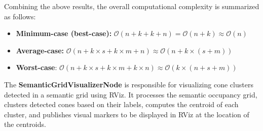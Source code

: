 \begin{itemize}
\end{itemize}

Combining the above results, the overall computational complexity is summarized as follows:

\begin{itemize}
    \item \textbf{Minimum-case (best-case):} $\mathcal{O}(n + k + k + n) = \mathcal{O}(n + k)\approx \mathcal{O}(n)$

    \item \textbf{Average-case:} $\mathcal{O}(n + k \times s + k \times m + n) \approx \mathcal{O}(n + k \times (s + m))$

    \item \textbf{Worst-case}: $\mathcal{O}(n + k \times s + k \times m + k \times n) \approx \mathcal{O}(k \times (n + s + m))$
\end{itemize}

The \textbf{SemanticGridVisualizerNode} is responsible for visualizing cone clusters detected in a semantic grid using RViz. It processes the semantic occupancy grid, clusters detected cones based on their labels, computes the centroid of each cluster, and publishes visual markers to be displayed in RViz at the location of the centroids.\\

